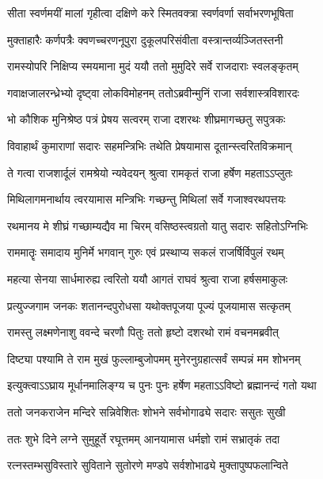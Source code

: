 \twolineshloka
{सीता स्वर्णमयीं मालां गृहीत्वा दक्षिणे करे}
{स्मितवक्त्रा स्वर्णवर्णा सर्वाभरणभूषिता} %

\twolineshloka
{मुक्ताहारैः कर्णपत्रैः क्वणच्चरणनूपुरा}
{दुकूलपरिसंवीता वस्त्रान्तर्व्यञ्जितस्तनी} %

\twolineshloka
{रामस्योपरि निक्षिप्य स्मयमाना मुदं ययौ}
{ततो मुमुदिरे सर्वे राजदाराः स्वलङ्कृतम्} %

\twolineshloka
{गवाक्षजालरन्ध्रेभ्यो दृष्ट्वा लोकविमोहनम्}
{ततोऽब्रवीन्मुनिं राजा सर्वशास्त्रविशारदः} %

\twolineshloka
{भो कौशिक मुनिश्रेष्ठ पत्रं प्रेषय सत्वरम्}
{राजा दशरथः शीघ्रमागच्छतु सपुत्रकः} %

\twolineshloka
{विवाहार्थं कुमाराणां सदारः सहमन्त्रिभिः}
{तथेति प्रेषयामास दूतान्स्त्वरितविक्रमान्} %

\twolineshloka
{ते गत्वा राजशार्दूलं रामश्रेयो न्यवेदयन्}
{श्रुत्वा रामकृतं राजा हर्षेण महताऽऽप्लुतः} %

\twolineshloka
{मिथिलागमनार्थाय त्वरयामास मन्त्रिभिः}
{गच्छन्तु मिथिलां सर्वे गजाश्वरथपत्तयः} %

\twolineshloka
{रथमानय मे शीघ्रं गच्छाम्यद्यैव मा चिरम्}
{वसिष्ठस्त्वग्रतो यातु सदारः सहितोऽग्निभिः} %

\twolineshloka
{राममातॄः समादाय मुनिर्मे भगवान् गुरुः}
{एवं प्रस्थाप्य सकलं राजर्षिर्विपुलं रथम्} %

\twolineshloka
{महत्या सेनया सार्धमारुह्य त्वरितो ययौ}
{आगतं राघवं श्रुत्वा राजा हर्षसमाकुलः} %

\twolineshloka
{प्रत्युज्जगाम जनकः शतानन्दपुरोधसा}
{यथोक्तपूजया पूज्यं पूजयामास सत्कृतम्} %

\twolineshloka
{रामस्तु लक्ष्मणेनाशु ववन्दे चरणौ पितुः}
{ततो हृष्टो दशरथो रामं वचनमब्रवीत्} %

\twolineshloka
{दिष्ट्या पश्यामि ते राम मुखं फुल्लाम्बुजोपमम्}
{मुनेरनुग्रहात्सर्वं सम्पन्नं मम शोभनम्} %

\twolineshloka
{इत्युक्त्वाऽऽघ्राय मूर्धानमालिङ्ग्य च पुनः पुनः}
{हर्षेण महताऽऽविष्टो ब्रह्मानन्दं गतो यथा} %

\twolineshloka
{ततो जनकराजेन मन्दिरे सन्निवेशितः}
{शोभने सर्वभोगाढ्ये सदारः ससुतः सुखी} %

\twolineshloka
{ततः शुभे दिने लग्ने सुमुहूर्ते रघूत्तमम्}
{आनयामास धर्मज्ञो रामं सभ्रातृकं तदा} %

\twolineshloka
{रत्नस्तम्भसुविस्तारे सुविताने सुतोरणे}
{मण्डपे सर्वशोभाढ्ये मुक्तापुष्पफलान्विते} %

